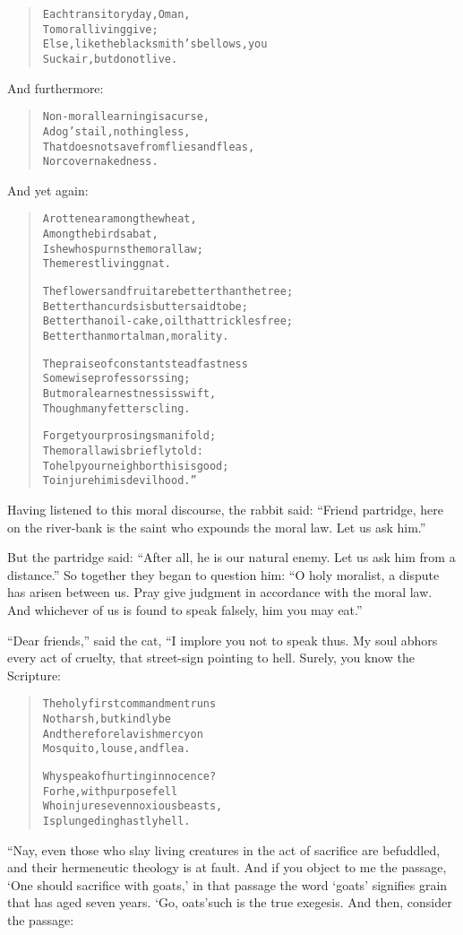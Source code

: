 \documentclass[article, twoside, 14pt]{memoir}
\renewenvironment{verbatim}{%
\begin{quote}%
\vskip -10pt%
\begin{alltt}\normalfont\large}{\end{alltt}%
\end{quote}%
\vskip -10pt
} %
\begin{document}
\begin{verbatim}
Each transitory day, O man,
    To moral living give;
Else, like the blacksmith's bellows, you
    Suck air, but do not live.
\end{verbatim}
And furthermore:

\begin{verbatim}
Non-moral learning is a curse,
    A dog's tail, nothing less,
That does not save from flies and fleas,
    Nor cover nakedness.
\end{verbatim}
And yet again:

\begin{verbatim}
A rotten ear among the wheat,
    Among the birds a bat,
Is he who spurns the moral law;
    The merest living gnat.

The flowers and fruit are better than the tree;
Better than curds is butter said to be;
Better than oil-cake, oil that trickles free;
Better than mortal man, morality.

The praise of constant steadfastness
    Some wise professors sing;
But moral earnestness is swift,
    Though many fetters cling.

Forget your prosings manifold;
The moral law is briefly told:
To help your neighbor{\textemdash}this is good;
To injure him is devilhood.”
\end{verbatim}
Having listened to this moral discourse, the rabbit said:
``Friend partridge, here on the river-bank is the saint who expounds the moral law. Let us ask him.''

But the partridge said:
``After all, he is our natural enemy. Let us ask him from a distance.''
So together they began to question him:
``O holy moralist, a dispute has arisen between us. Pray give judgment in accordance with the moral law. And whichever of us is found to speak falsely, him you may eat.''

``Dear friends,'' said the cat, “I implore you not to speak thus.
My soul abhors every act of cruelty, that street-sign pointing to
hell. Surely, you know the Scripture:

\begin{verbatim}
The holy first commandment runs{\textemdash}
    Not harsh, but kindly be{\textemdash}
And therefore lavish mercy on
    Mosquito, louse, and flea.

Why speak of hurting innocence?
    For he, with purpose fell
Who injures even noxious beasts,
    Is plunged in ghastly hell.
\end{verbatim}
“Nay, even those who slay living creatures in the act of sacrifice
are befuddled, and their hermeneutic theology is at fault. And if
you object to me the passage, `One should sacrifice with goats,' in
that passage the word `goats' signifies grain that has aged seven
years. `Go, oats'{\textemdash}such is the true exegesis. And then, consider
the passage:
\end{document}
